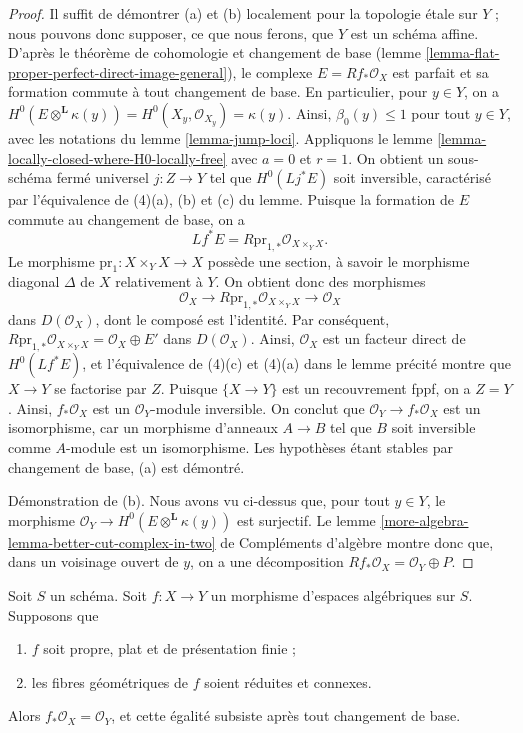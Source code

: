 \begin{proof}
Il suffit de d\'emontrer (a) et (b) localement pour la topologie \'etale sur
$Y$ ; nous pouvons donc supposer, ce que nous ferons, que $Y$ est un sch\'ema
affine. D'apr\`es le th\'eor\`eme de cohomologie et changement de base
(lemme \ref{lemma-flat-proper-perfect-direct-image-general}), le complexe
$E=Rf_*\mathcal{O}_X$ est parfait et sa formation commute \`a tout changement
de base. En particulier, pour $y\in Y$, on a
$H^0(E\otimes^\mathbf{L}\kappa(y))=
H^0(X_y,\mathcal{O}_{X_y})=\kappa(y)$.
Ainsi, $\beta_0(y)\leq1$ pour tout $y\in Y$, avec les notations du lemme
\ref{lemma-jump-loci}. Appliquons le lemme
\ref{lemma-locally-closed-where-H0-locally-free} avec $a=0$ et $r=1$.
On obtient un sous-sch\'ema ferm\'e universel $j:Z\to Y$ tel que
$H^0(Lj^*E)$ soit inversible, caract\'eris\'e par l'\'equivalence de (4)(a),
(b) et (c) du lemme. Puisque la formation de $E$ commute au changement de
base, on a
$$
Lf^*E = R\text{pr}_{1, *}\mathcal{O}_{X \times_Y X}.
$$
Le morphisme $\text{pr}_1:X\times_YX\to X$ poss\`ede une section, \`a savoir le
morphisme diagonal $\Delta$ de $X$ relativement à $Y$. On obtient donc des morphismes
$$
\mathcal{O}_X \longrightarrow R\text{pr}_{1, *}\mathcal{O}_{X \times_Y X}
\longrightarrow \mathcal{O}_X
$$
dans $D(\mathcal{O}_X)$, dont le compos\'e est l'identit\'e. Par cons\'equent,
$R\text{pr}_{1,*}\mathcal{O}_{X\times_YX}=\mathcal{O}_X\oplus E'$ dans
$D(\mathcal{O}_X)$. Ainsi, $\mathcal{O}_X$ est un facteur direct de
$H^0(Lf^*E)$, et l'\'equivalence de (4)(c) et (4)(a) dans le lemme pr\'ecit\'e
montre que $X\to Y$ se factorise par $Z$. Puisque $\{X\to Y\}$ est un
recouvrement fppf, on a $Z=Y$. Ainsi, $f_*\mathcal{O}_X$ est un
$\mathcal{O}_Y$-module inversible. On conclut que
$\mathcal{O}_Y\to f_*\mathcal{O}_X$ est un isomorphisme, car un morphisme
d'anneaux $A\to B$ tel que $B$ soit inversible comme $A$-module est un
isomorphisme. Les hypoth\`eses \'etant stables par changement de base, (a) est
d\'emontr\'e.

\medskip\noindent
D\'emonstration de (b). Nous avons vu ci-dessus que, pour tout $y\in Y$, le
morphisme $\mathcal{O}_Y\to H^0(E\otimes^\mathbf{L}\kappa(y))$ est surjectif.
Le lemme \ref{more-algebra-lemma-better-cut-complex-in-two} de Compl\'ements
d'alg\`ebre montre donc que, dans un voisinage ouvert de $y$, on a une
d\'ecomposition $Rf_*\mathcal{O}_X=\mathcal{O}_Y\oplus P$.
\end{proof}

\begin{lemma}
\label{lemma-proper-flat-geom-red-connected}
Soit $S$ un sch\'ema.
Soit $f:X\to Y$ un morphisme d'espaces alg\'ebriques sur $S$. Supposons que
\begin{enumerate}
\item $f$ soit propre, plat et de pr\'esentation finie ;
\item les fibres g\'eom\'etriques de $f$ soient r\'eduites et connexes.
\end{enumerate}
Alors $f_*\mathcal{O}_X=\mathcal{O}_Y$, et cette \'egalit\'e subsiste apr\`es
tout changement de base.
\end{lemma}

